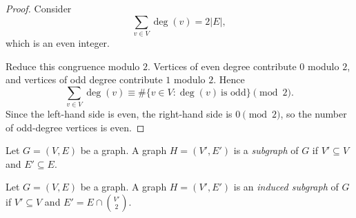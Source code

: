 \documentclass[11pt, a4paper]{ctexrep}
\begin{document}
\begin{proof}
    Consider
    \[
        \sum_{v\in V} \deg(v) = 2|E|,
    \]
    which is an even integer.

    Reduce this congruence modulo $2$. Vertices of even degree contribute $0$ modulo $2$, and vertices of odd degree contribute $1$ modulo $2$. Hence
    \[
        \sum_{v\in V} \deg(v) \equiv \#\{v\in V:\deg(v)\ \text{is odd}\} \pmod{2}.
    \]
    Since the left-hand side is even, the right-hand side is $0 \pmod{2}$, so the number of odd-degree vertices is even.
\end{proof}

\begin{definition}[subgraph]
    Let $ G=(V,E) $ be a graph. A graph $ H=(V',E') $ is a \emph{subgraph} of $ G $ if $ V' \subseteq V $ and $ E' \subseteq E $.
\end{definition}

\begin{definition}
    Let $ G=(V,E) $ be a graph. A graph $ H=(V',E') $ is an \emph{induced subgraph} of $ G $ if $ V' \subseteq V $ and $ E' = E \cap \binom{V'}{2} $.
\end{definition}
\end{document}
